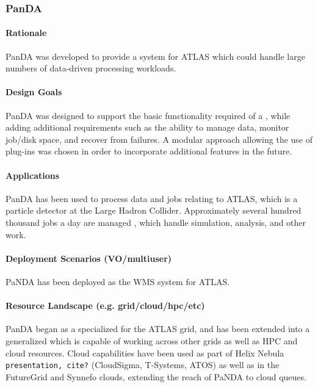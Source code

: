 \documentclass{sig-alternate}
\begin{document}
\subsubsection{PanDA}

\paragraph{Rationale}
PanDA was developed to provide a \pilotjob system for ATLAS which could
handle large numbers of data-driven processing workloads.

\paragraph{Design Goals}
PanDA was designed to support the basic functionality required of a
\pilotjob, while adding additional requirements such as the ability
to manage data, monitor job/disk space, and recover from failures.
A modular approach allowing the use of plug-ins was chosen in order
to incorporate additional features in the future.

\paragraph{Applications}
PanDA has been used to process data and jobs relating to ATLAS, which is
a particle detector at the Large Hadron Collider.  Approximately
several hundred thousand jobs a day are managed , which handle
simulation, analysis, and other work.

\paragraph{Deployment Scenarios (VO/multiuser)}
PaNDA has been deployed as the WMS system for ATLAS.  

\paragraph{Resource Landscape (e.g. grid/cloud/hpc/etc)}
PanDA began as a specialized \pilotjob for the ATLAS grid, and has been extended
into a generalized \pilotjob which is capable of working across other grids
as well as HPC and cloud resources.  
Cloud capabilities have been used as part
of Helix Nebula \texttt{presentation, cite?} (CloudSigma, T-Systems, ATOS) as well
as in the FutureGrid and Synnefo clouds, extending the reach of PaNDA to
cloud queues.  
\end{document}
